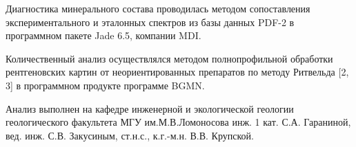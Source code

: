 Диагностика минерального состава проводилась методом сопоставления экспериментального и эталонных 
спектров из базы данных PDF-2 в программном пакете Jade 6.5, компании MDI.

Количественный анализ осуществлялся методом полнопрофильной обработки рентгеновских 
картин от неориентированных препаратов по методу Ритвельда [2, 3] в программном продукте программе BGMN.

Анализ выполнен на кафедре инженерной и экологической геологии геологического факультета МГУ им.М.В.Ломоносова
инж. 1 кат. С.А. Гараниной, вед. инж. С.В. Закусиным, ст.н.с., к.г.-м.н. В.В. Крупской.
